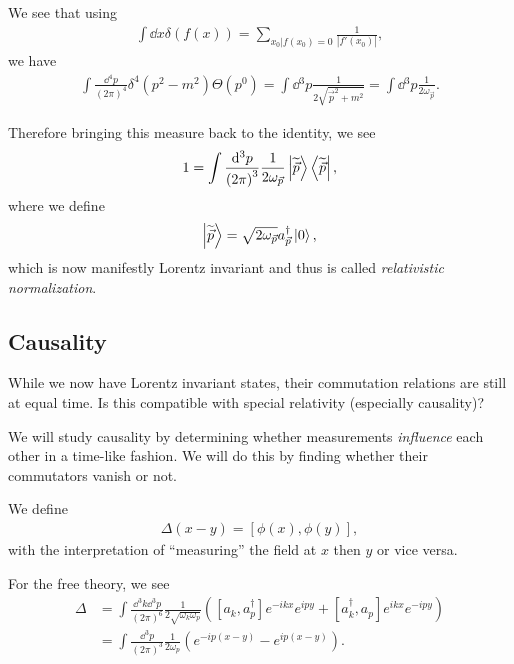We see that using 
\begin{align}
    \int \dd{x} \delta \left( f \left( x \right)  \right) = \sum_{x_0 | f\left( x_0 \right) = 0}^{} \frac{1}{\left| f'\left( x_0 \right)  \right| }
,\end{align}
we have
\begin{align}
\int \frac{\dd{^{4}p}}{\left( 2\pi \right)^{4}} \delta^{4} \left( p^2 - m^2 \right)  \Theta \left( p^0 \right) = \int \dd{^3p} \frac{1}{2 \sqrt{\vec{p}^2 + m^2}} = \int \dd{^3p} \frac{1}{2 \omega_{\vec{p}}}
.\end{align}

Therefore bringing this measure back to the identity, we see
\begin{align}
    1 = \int \frac{\dd{^3p}}{\left( 2\pi \right)^3} \frac{1}{2 \omega_{\vec{p}}} \ket{\widetilde{\vec{p}}} \bra{\widetilde{\vec{p}}}
,\end{align}
where we define
\begin{align}
    \ket{\widetilde{\vec{p}}} = \sqrt{2 \omega_{\vec{p}}} a^{\dag}_{\vec{p}} \ket{0} 
,\end{align}
which is now manifestly Lorentz invariant and thus is called \textit{relativistic normalization}.

\subsection{Causality}

While we now have Lorentz invariant states, their commutation relations are still at equal time. Is this compatible with special relativity (especially causality)?

We will study causality by determining whether measurements \textit{influence} each other in a time-like fashion. We will do this by finding whether their commutators vanish or not.

We define
\begin{align}
    \Delta \left( x - y \right) = \left[ \phi \left( x \right) , \phi \left( y \right)  \right] 
,\end{align}
with the interpretation of ``measuring'' the field at $x$ then $y$ or vice versa.

For the free theory, we see
\begin{align}
    \Delta &= \int \frac{\dd{^3k} \dd{^3p}}{\left( 2\pi \right)^{6}} \frac{1}{2 \sqrt{\omega_k \omega_p} } \left( \left[ a_k, a_p^{\dag} \right] e^{-ikx} e^{i py} + \left[ a_k^{\dag}, a_p  \right] e^{ikx} e^{-ipy}   \right) \\
    &= \int \frac{\dd{^3p}}{\left( 2\pi \right)^3} \frac{1}{2 \omega_p} \left( e^{-i p \left( x - y \right) } - e^{i p \left( x -y \right) } \right)
.\end{align}


